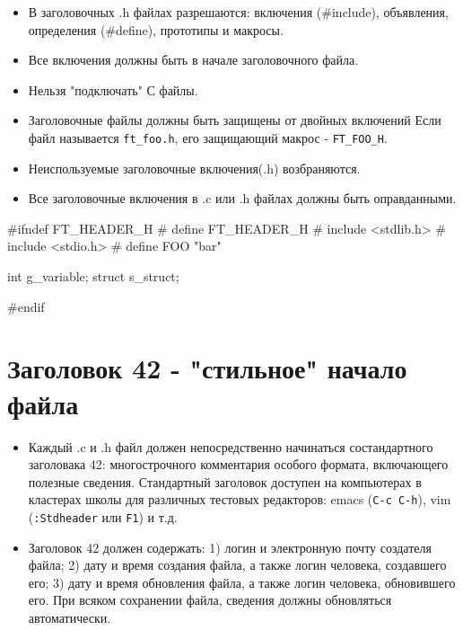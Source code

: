 \documentclass{42-ru}
\begin{document}
        \begin{itemize}

            \item В заголовочных .h файлах разрешаются: включения (#include),
                объявления, определения (#define), прототипы и макросы.

            \item Все включения должны быть в начале заголовочного файла.

            \item Нельзя "подключать" С файлы.

            \item Заголовочные файлы должны быть защищены от двойных включений
                Если файл называется \texttt{ft\_foo.h}, его защищающий макрос - \texttt{FT\_FOO\_H}.

            \item Неиспользуемые заголовочные включения(.h) возбраняются.

            \item Все заголовочные включения в .c или .h файлах должны быть оправданными.

        \end{itemize}

        \begin{42ccode}
#ifndef FT_HEADER_H
# define FT_HEADER_H
# include <stdlib.h>
# include <stdio.h>
# define FOO "bar"

int		g_variable;
struct	s_struct;

#endif
        \end{42ccode}
        \newpage



   \section{Заголовок 42 - "стильное" начало файла}

        \begin{itemize}

        \item Каждый .c и .h файл должен непосредственно начинаться состандартного заголовака 42:
            многострочного комментария особого формата, включающего полезные сведения.
            Стандартный заголовок доступен на компьютерах в кластерах школы для различных
            тестовых редакторов: emacs (\texttt{C-c C-h}), vim (\texttt{:Stdheader} или \texttt{F1}) и т.д.

        \item Заголовок 42 должен содержать: 1) логин и электронную почту создателя файла;
            2) дату и время создания файла, а также логин человека, создавшего его;
            3) дату и время обновления файла, а также логин человека, обновившего его.
            При всяком сохранении файла, сведения должны обновляться автоматически.

        \end{itemize}
        \newpage
        
\end{document}
